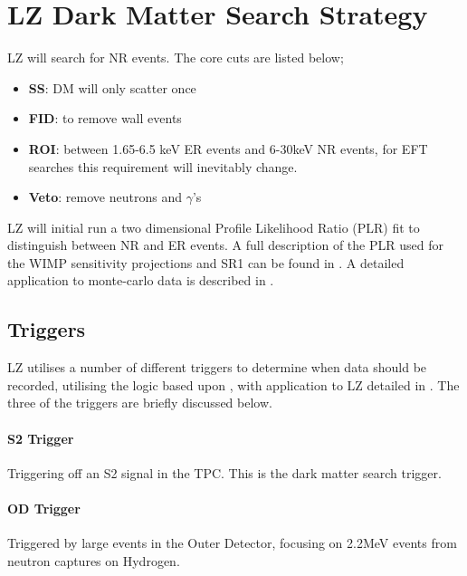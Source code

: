 \section{LZ Dark Matter Search Strategy}
\par
LZ will search for NR events.
The core cuts are listed below;
\begin{itemize}
    \item \textbf{SS}: DM will only scatter once
    \item \textbf{FID}: to remove wall events
    \item \textbf{ROI}: between 1.65-6.5 keV ER events and 6-30keV NR events, for EFT searches this requirement will inevitably change.
    \item \textbf{Veto}: remove neutrons and $\gamma$'s 
\end{itemize}

\par
LZ will initial run a two dimensional Profile Likelihood Ratio (PLR) fit to distinguish between NR and ER events.
A full description of the PLR used for the WIMP sensitivity projections and SR1 can be found in \cite{LZ_Ibles_LZStats_Thesis_ref}. 
A detailed application to monte-carlo data is described in \cite{jonathannikoleyczik_thesis_ref}.




\subsection{Triggers}
\par
LZ utilises a number of different triggers to determine when data should be recorded, utilising the logic based upon \cite{lux_trigger_logic_ref}, with application to LZ detailed in \cite{nicolasangelides_thesis_ref}.
The three of the triggers are briefly discussed below.


\paragraph{S2 Trigger}
\par
Triggering off an S2 signal in the TPC. 
This is the dark matter search trigger.

\paragraph{OD Trigger}
\par
Triggered by large events in the Outer Detector, focusing on 2.2MeV events from neutron captures on Hydrogen.

